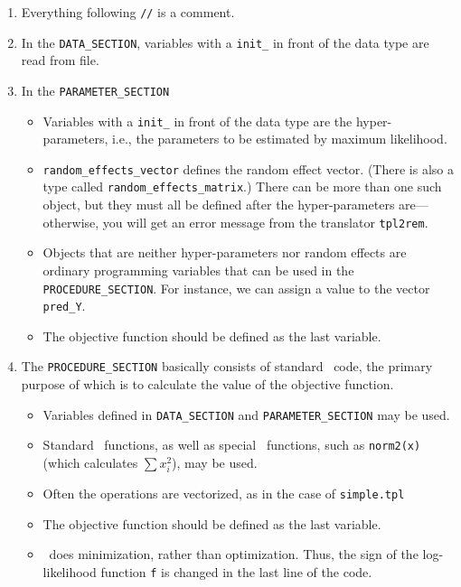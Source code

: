 \documentclass{admbmanual}
\begin{document}
\begin{enumerate}
  \item Everything following \texttt{//} is a comment.

  \item In the \texttt{DATA\_SECTION}, variables with a \texttt{init\_} in front
  of the data type are read from file.

  \item In the \texttt{PARAMETER\_SECTION}
  \begin{itemize}
    \item Variables with a \texttt{init\_} in front of the data type are the
    hyper-parameters, i.e., the parameters to be estimated by maximum
    likelihood.

    \item \texttt{random\_effects\_vector} defines the random effect vector.
    (There is also a type called \texttt{random\_effects\_matrix}.) There can be
    more than one such object, but they must all be defined after the
    hyper-parameters are---otherwise, you will get an error message from the
    translator \texttt{tpl2rem}.

    \item Objects that are neither hyper-parameters nor random effects are
    ordinary programming variables that can be used in the
    \texttt{PROCEDURE\_SECTION}. For instance, we can assign a value to the
    vector \texttt{pred\_Y}.

    \item The objective function should be defined as the last variable.
  \end{itemize}

  \item The \texttt{PROCEDURE\_SECTION} basically consists of standard \cplus\
  code, the primary purpose of which is to calculate the value of the objective
  function.
  \begin{itemize}
    \item Variables defined in \texttt{DATA\_SECTION} and
    \texttt{PARAMETER\_SECTION} may be used.

    \item Standard \cplus\ functions, as well as special \scAB\ functions, such
    as \texttt{norm2(x)} (which calculates $\sum x_i^2$), may be used.

    \item Often the operations are vectorized, as in the case of
    \texttt{simple.tpl}

    \item The objective function should be defined as the last variable.

    \item \scAB\ does minimization, rather than optimization. Thus, the sign of
    the log-likelihood function \texttt{f} is changed in the last line of the
    code.
  \end{itemize}
\end{enumerate}
\end{document}
